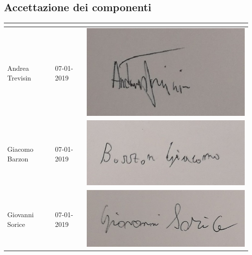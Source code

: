 \subsection{Accettazione dei componenti}
\renewcommand{\arraystretch}{2}
\begin{table}[H]
\begin{center}
  \begin{tabular}{| M{3cm} | M{3cm} | M{6cm} |}
    \hline
    \textbf{\color{title_text}{Nominativo}} & \textbf{\color{title_text}{Data}} & \textbf{\color{title_text}{Firma}} \\ \hline
    Andrea Trevisin & 07-01-2019 & \includegraphics[scale=0.25]{Res/Firme/andrea.jpg} \\ \hline
    Giacomo Barzon & 07-01-2019 & \includegraphics[scale=0.25]{Res/Firme/giacomo.jpg} \\ \hline
    Giovanni Sorice & 07-01-2019 & \includegraphics[scale=0.25]{Res/Firme/ciro.jpg} \\ \hline

\end{tabular}
\end{center}
\end{table}
